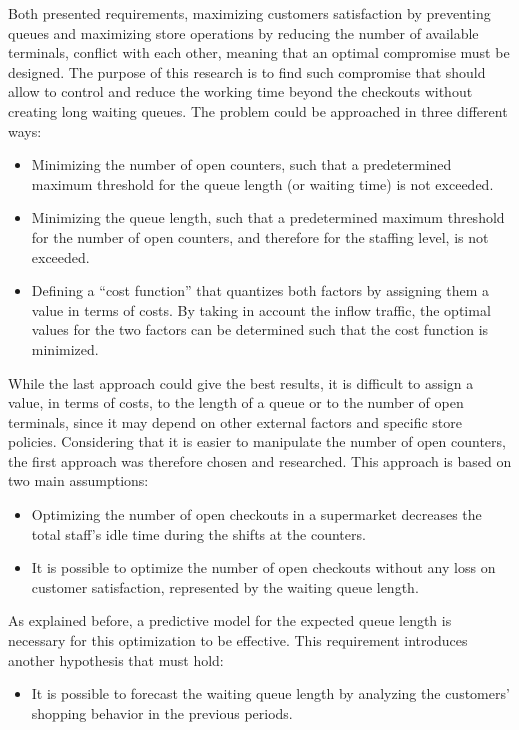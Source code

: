 Both presented requirements, maximizing customers satisfaction by preventing queues and maximizing store operations by reducing the number of available terminals, conflict with each other, meaning that an optimal compromise must be designed. The purpose of this research is to find such compromise that should allow to control and reduce the working time beyond the checkouts without creating long waiting queues. The problem could be approached in three different ways:
\begin{itemize}
  \item Minimizing the number of open counters, such that a predetermined maximum threshold for the queue length (or waiting time) is not exceeded.
  \item Minimizing the queue length, such that a predetermined maximum threshold for the number of open counters, and therefore for the staffing level, is not exceeded.
  \item Defining a “cost function” that quantizes both factors by assigning them a value in terms of costs. By taking in account the inflow traffic, the optimal values for the two factors can be determined such that the cost function is minimized.
\end{itemize}

While the last approach could give the best results, it is difficult to assign a value, in terms of costs, to the length of a queue or to the number of open terminals, since it may depend on other external factors and specific store policies. Considering that it is easier to manipulate the number of open counters, the first approach was therefore chosen and researched. This approach is based on two main assumptions:
\begin{itemize}
  \item Optimizing the number of open checkouts in a supermarket decreases the total staff’s idle time during the shifts at the counters.
  \item It is possible to optimize the number of open checkouts without any loss on customer satisfaction, represented by the waiting queue length.
\end{itemize}

As explained before, a predictive model for the expected queue length is necessary for this optimization to be effective. This requirement introduces another hypothesis that must hold:
\begin{itemize}
  \item It is possible to forecast the waiting queue length by analyzing the customers’ shopping behavior in the previous periods.
\end{itemize}

